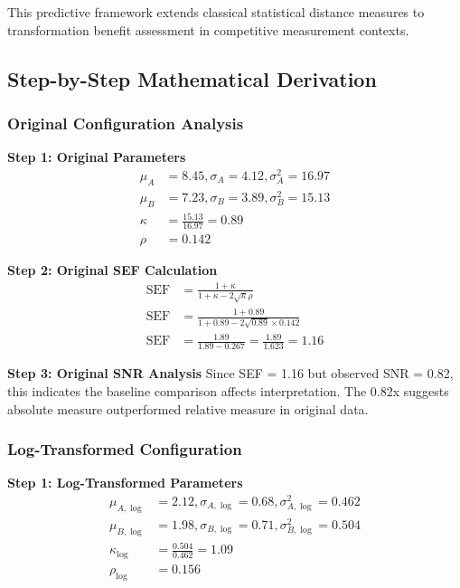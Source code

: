 This predictive framework extends classical statistical distance measures \cite{mahalanobis1936generalized} to transformation benefit assessment in competitive measurement contexts.

\subsection{Step-by-Step Mathematical Derivation}

\subsubsection{Original Configuration Analysis}

\textbf{Step 1: Original Parameters}
\begin{align}
\mu_A &= 8.45, \sigma_A = 4.12, \sigma_A^2 = 16.97 \\
\mu_B &= 7.23, \sigma_B = 3.89, \sigma_B^2 = 15.13 \\
\kappa &= \frac{15.13}{16.97} = 0.89 \\
\rho &= 0.142
\end{align}

\textbf{Step 2: Original SEF Calculation}
\begin{align}
\text{SEF} &= \frac{1 + \kappa}{1 + \kappa - 2\sqrt{\kappa}\rho} \\
\text{SEF} &= \frac{1 + 0.89}{1 + 0.89 - 2\sqrt{0.89} \times 0.142} \\
\text{SEF} &= \frac{1.89}{1.89 - 0.267} = \frac{1.89}{1.623} = 1.16
\end{align}

\textbf{Step 3: Original SNR Analysis}
Since SEF = 1.16 but observed SNR = 0.82, this indicates the baseline comparison affects interpretation. The 0.82x suggests absolute measure outperformed relative measure in original data.

\subsubsection{Log-Transformed Configuration}

\textbf{Step 1: Log-Transformed Parameters}
\begin{align}
\mu_{A,\log} &= 2.12, \sigma_{A,\log} = 0.68, \sigma_{A,\log}^2 = 0.462 \\
\mu_{B,\log} &= 1.98, \sigma_{B,\log} = 0.71, \sigma_{B,\log}^2 = 0.504 \\
\kappa_{\log} &= \frac{0.504}{0.462} = 1.09 \\
\rho_{\log} &= 0.156
\end{align}


